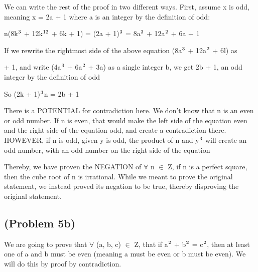 \documentclass{article}
\begin{document}
\par\vspace{0.5cm}\noindent We can write the rest of the proof in two different ways.  First, assume x is odd, meaning x = 2a + 1 where a is an integer by the definition of odd:
\par\vspace{0.5cm}\noindent n(8k$\textsuperscript{3}$ + 12k$\textsuperscript{12}$ + 6k + 1) = (2a + 1)$\textsuperscript{3}$ = 8a$\textsuperscript{3}$ + 12a$\textsuperscript{2}$ + 6a + 1

\par\vspace{0.5cm}\noindent If we rewrite the rightmost side of the above equation (8a$\textsuperscript{3}$ + 12a$\textsuperscript{2}$ + 6l) as \par{} + 1, and write (4a$\textsuperscript{3}$ + 6a$\textsuperscript{2}$ + 3a) as a single integer b, we get 2b + 1, an odd integer by the definition of odd

\par\vspace{0.5cm}\noindent So (2k + 1)$\textsuperscript{3}$n = 2b + 1

\par\vspace{0.5cm}\noindent There is a POTENTIAL for contradiction here.  We don't know that n is an even or odd number.  If n is even, that would make the left side of the equation even and the right side of the equation odd, and create a contradiction there.  HOWEVER, if n is odd, given y is odd, the product of n and y$\textsuperscript{3}$ will create an odd number, with an odd number on the right side of the equation

\par\vspace{0.5cm}\noindent Thereby, we have proven the NEGATION of $\forall$ n $\in$ Z, if n is a perfect square, then the cube root of n is irrational.  While we meant to prove the original statement, we instead proved its negation to be true, thereby disproving the original statement.

\subsection{(Problem 5b)}

We are going to prove that $\forall$ (a, b, c) $\in$ Z, that if a$\textsuperscript{2}$ + b$\textsuperscript{2}$ = c$\textsuperscript{2}$, then at least one of a and b must be even (meaning a must be even or b must be even).  We will do this by proof by contradiction.
\end{document}
